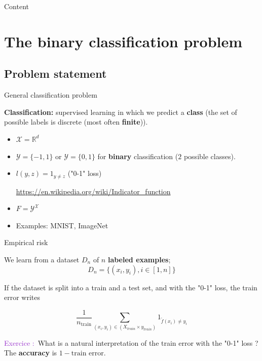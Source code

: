\documentclass[usenames,dvipsnames,french]{beamer}
\newcounter{numexos}%
\newcommand{\exercice}[1]{%
\addtocounter{numexos}{1}%
\textcolor{DarkOrchid}{Exercice\,\thenumexos\,:}\,#1%
}
\begin{document}
\frame{\titlepage}

\begin{frame}{Content}

    \tableofcontents

\end{frame}

\section{The binary classification problem}%
\label{sec:classification}

\subsection{Problem statement}%
\label{sub:problem_statement}

\begin{frame}{General classification problem}

    \textbf{Classification:} supervised learning in which we predict a \textbf{class} (the set of possible labels is discrete (most often \textbf{finite})).

    \begin{itemize}
        \item $ \mathcal{X} = \mathbb{R}^d$
	\item $ \mathcal{Y}  = \{-1, 1\}$ or $ \mathcal{Y}  = \{0, 1\}$ for \textbf{binary} classification ($2$ possible classes).
	\item $l(y,z) = 1_{y\neq z}$ ("0-1" loss)

	    \url{https://en.wikipedia.org/wiki/Indicator_function} 

	\item $F = \mathcal{Y}^{ \mathcal{X} }$
	\item Examples: MNIST, ImageNet
    \end{itemize}
\end{frame}

\begin{frame}{Empirical risk}

    We learn from a dataset $D_n$ of $n$ \textbf{labeled examples}; 
\begin{equation}
    D_n =\{(x_i,y_i), i\in[1, n]\}
\end{equation}

If the dataset is split into a train and a test set, and with the "0-1" loss, the train error writes

	    \begin{equation}
		\frac{1}{n_{\text{train}}}\sum_{(x_i, y_i)\in (X_{train}\times y_{train})} 1_{{\tilde{f}(x_i)\neq y_i}}
	    \end{equation}

	    \exercice{}What is a natural interpretation of the train error with the "0-1" loss ?
	    \\

	    The \textbf{accuracy} is $1-\text{train error}$.
\end{frame}
\end{document}
